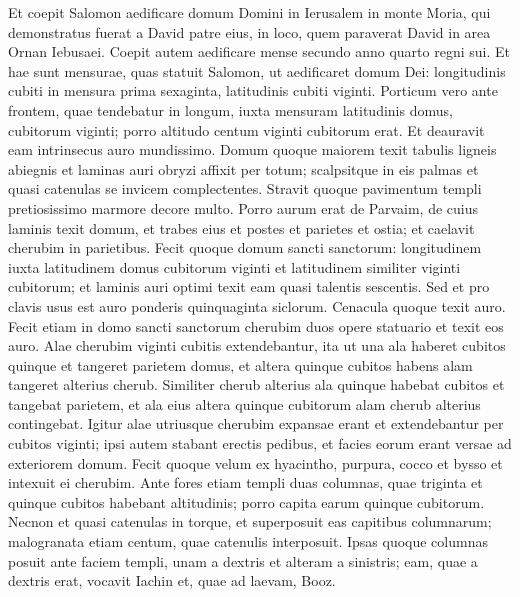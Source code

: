\begin{biblechapter}  
\verse Et coepit Salomon aedificare domum Domini in Ierusalem in monte Moria, qui demonstratus fuerat a David patre eius, in loco, quem paraverat David in area Ornan Iebusaei. 
\verse Coepit autem aedificare mense secundo anno quarto regni sui. 
\verse Et hae sunt mensurae, quas statuit Salomon, ut aedificaret domum Dei: longitudinis cubiti in mensura prima sexaginta, latitudinis cubiti viginti.  
\verse Porticum vero ante frontem, quae tendebatur in longum, iuxta mensuram latitudinis domus, cubitorum viginti; porro altitudo centum viginti cubitorum erat. Et deauravit eam intrinsecus auro mundissimo. 
\verse Domum quoque maiorem texit tabulis ligneis abiegnis et laminas auri obryzi affixit per totum; scalpsitque in eis palmas et quasi catenulas se invicem complectentes. 
\verse Stravit quoque pavimentum templi pretiosissimo marmore decore multo. 
\verse Porro aurum erat de Parvaim, de cuius laminis texit domum, et trabes eius et postes et parietes et ostia; et caelavit cherubim in parietibus. 
\verse Fecit quoque domum sancti sanctorum: longitudinem iuxta latitudinem domus cubitorum viginti et latitudinem similiter viginti cubitorum; et laminis auri optimi texit eam quasi talentis sescentis. 
\verse Sed et pro clavis usus est auro ponderis quinquaginta siclorum. Cenacula quoque texit auro. 
\verse Fecit etiam in domo sancti sanctorum cherubim duos opere statuario et texit eos auro. 
\verse Alae cherubim viginti cubitis extendebantur, ita ut una ala haberet cubitos quinque et tangeret parietem domus, et altera quinque cubitos habens alam tangeret alterius cherub. 
\verse Similiter cherub alterius ala quinque habebat cubitos et tangebat parietem, et ala eius altera quinque cubitorum alam cherub alterius contingebat. 
\verse Igitur alae utriusque cherubim expansae erant et extendebantur per cubitos viginti; ipsi autem stabant erectis pedibus, et facies eorum erant versae ad exteriorem domum. 
\verse Fecit quoque velum ex hyacintho, purpura, cocco et bysso et intexuit ei cherubim. 
\verse Ante fores etiam templi duas columnas, quae triginta et quinque cubitos habebant altitudinis; porro capita earum quinque cubitorum. 
\verse Necnon et quasi catenulas in torque, et superposuit eas capitibus columnarum; malogranata etiam centum, quae catenulis interposuit. 
\verse Ipsas quoque columnas posuit ante faciem templi, unam a dextris et alteram a sinistris; eam, quae a dextris erat, vocavit Iachin et, quae ad laevam, Booz. 
\end{biblechapter}

